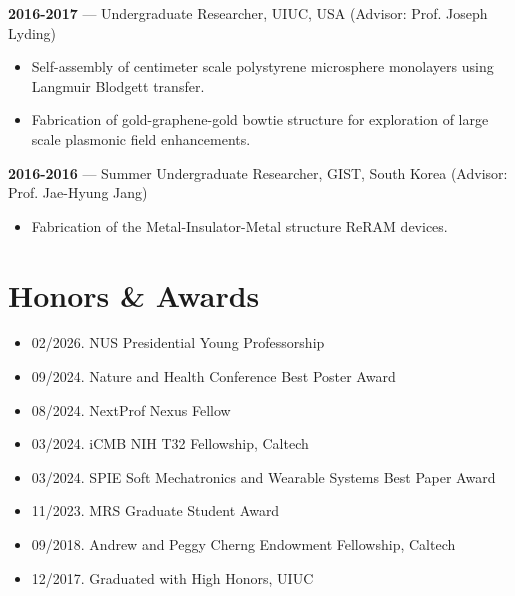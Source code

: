 \documentclass[11pt,a4paper]{article}
\begin{document}
\textbf{2016-2017} — Undergraduate Researcher, UIUC, USA (Advisor: Prof. Joseph Lyding)
\begin{itemize}[leftmargin=*, itemsep=2pt, parsep=0pt, topsep=2pt]
  \item Self-assembly of centimeter scale polystyrene microsphere monolayers using Langmuir Blodgett transfer.
  \item Fabrication of gold-graphene-gold bowtie structure for exploration of large scale plasmonic field enhancements.
\end{itemize}
\textbf{2016-2016} — Summer Undergraduate Researcher, GIST, South Korea (Advisor: Prof. Jae-Hyung Jang)
\begin{itemize}[leftmargin=*, itemsep=2pt, parsep=0pt, topsep=2pt]
  \item Fabrication of the Metal-Insulator-Metal structure ReRAM devices.
\end{itemize}

\section{Honors \& Awards}
\begin{itemize}[leftmargin=*, itemsep=1pt, parsep=0pt, topsep=2pt]
  \item 02/2026. NUS Presidential Young Professorship
  \item 09/2024. Nature and Health Conference Best Poster Award
  \item 08/2024. NextProf Nexus Fellow
  \item 03/2024. iCMB NIH T32 Fellowship, Caltech
  \item 03/2024. SPIE Soft Mechatronics and Wearable Systems Best Paper Award
  \item 11/2023. MRS Graduate Student Award
  \item 09/2018. Andrew and Peggy Cherng Endowment Fellowship, Caltech
  \item 12/2017. Graduated with High Honors, UIUC
\end{itemize}
\end{document}
